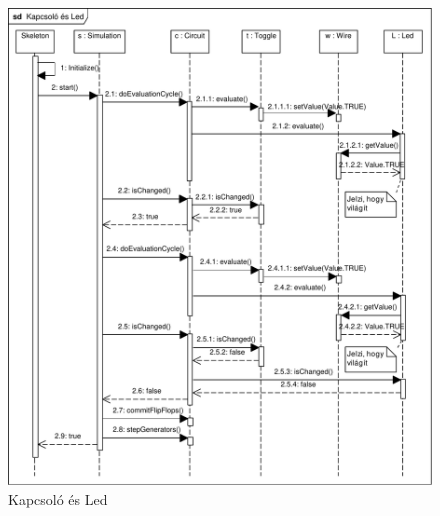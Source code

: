 \begin{figure}[H]
\begin{center}
\includegraphics[width=17cm]{chapters/chapter05/imgs/test1.pdf}
\caption{Kapcsoló és Led}
\label{fig:toggle_led}
\end{center}
\end{figure}

